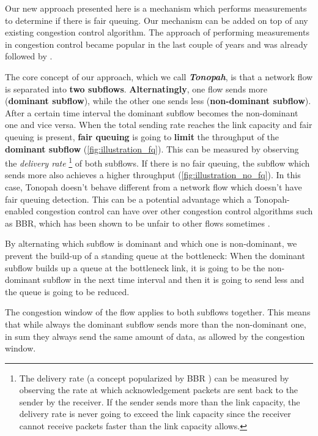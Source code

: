 \documentclass[conference]{IEEEtran}
\begin{document}
Our new approach presented here is a mechanism which performs measurements to determine if there is fair queuing. Our mechanism can be added on top of any existing congestion control algorithm. 
The approach of performing measurements in congestion control became popular in the last couple of years and was already followed by \cite{cardwell_bbr_2016,dong_pcc_2015,goyal_elasticity_2020,hayes_online_2020}.

The core concept of our approach, which we call \textbf{\textit{Tonopah}}, is that a network flow is separated into \textbf{two subflows}. 
\textbf{Alternatingly}, one flow sends more (\textbf{dominant subflow}), while the other one sends less (\textbf{non-dominant subflow}). 
After a certain time interval the dominant subflow becomes the non-dominant one and vice versa. 
When the total sending rate reaches the link capacity and fair queuing is present, 
\textbf{fair queuing} is going to \textbf{limit} the throughput of the \textbf{dominant subflow} (\autoref{fig:illustration_fq}). 
This can be measured by observing the \textit{delivery rate}
\footnote{The delivery rate (a concept popularized by BBR \cite{cardwell_bbr_2016}) can be measured by observing the rate at which acknowledgement packets are sent back to the sender by the receiver.
If the sender sends more than the link capacity, the delivery rate is never going to exceed the link capacity since the receiver cannot receive packets faster than the link capacity allows. 
}
of both subflows. If there is no fair queuing, the subflow which sends more also achieves a higher throughput (\autoref{fig:illustration_no_fq}). 
In this case, Tonopah doesn't behave different from a network flow which doesn't have fair queuing detection. 
This can be a potential advantage which a Tonopah-enabled congestion control can have over other congestion control algorithms such as BBR, which has been shown to be unfair to other flows sometimes \cite{ware_modeling_2019}.

By alternating which subflow is dominant and which one is non-dominant, we prevent the build-up of a standing queue at the bottleneck: 
When the dominant subflow builds up a queue at the bottleneck link, it is going to be the non-dominant subflow in the next time interval and then it is going to send less and the queue is going to be reduced. 

The congestion window of the flow applies to both subflows together. This means that while always the dominant subflow sends more than the non-dominant one, in sum they always send the same amount of data, as allowed by the congestion window.
\end{document}
